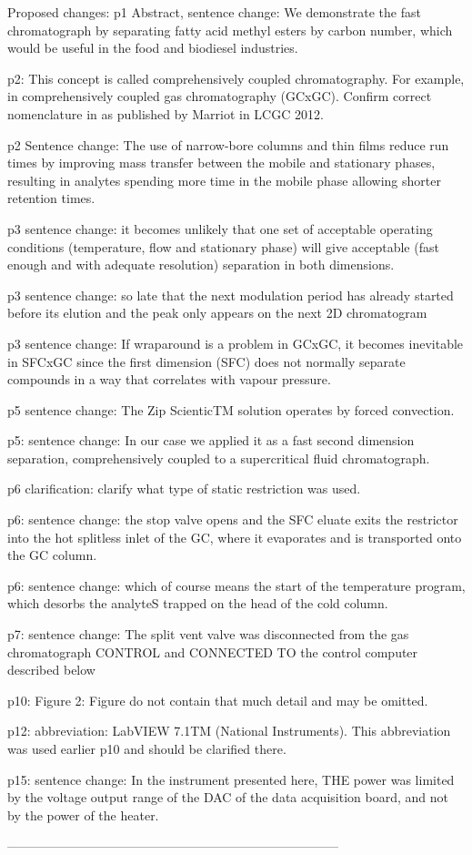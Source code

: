 Proposed changes:
p1 Abstract, sentence change: We demonstrate the fast chromatograph by separating fatty acid methyl esters by carbon number, which would be useful in the food and biodiesel industries.

p2: This concept is called comprehensively coupled chromatography. For example, in comprehensively coupled gas chromatography (GCxGC). Confirm correct nomenclature in as published by Marriot in LCGC 2012.

p2 Sentence change: The use of narrow-bore columns and thin films reduce run times by improving mass transfer between the mobile and stationary phases, resulting in analytes spending more time in the mobile phase allowing shorter retention times.

p3 sentence change: it becomes unlikely that one set of acceptable operating conditions (temperature, flow and stationary phase) will give acceptable (fast enough and with adequate resolution) separation in both dimensions.

p3 sentence change: so late that the next modulation period has already started before its elution and the peak only appears on the next 2D chromatogram

p3 sentence change: If wraparound is a problem in GCxGC, it becomes inevitable in SFCxGC since the first dimension (SFC) does not normally separate compounds in a way that correlates with vapour pressure.

p5 sentence change: The Zip ScienticTM solution operates by forced convection.

p5: sentence change: In our case we applied it as a fast second dimension separation, comprehensively coupled to a supercritical fluid chromatograph.

p6 clarification: clarify what type of static restriction was used.

p6: sentence change: the stop valve opens and the SFC eluate exits the restrictor into the hot splitless inlet of the GC, where it evaporates and is transported onto the GC column.

p6: sentence change: which of course means the start of the temperature program, which desorbs the analyteS trapped on the head of the cold column.

p7: sentence change: The split vent valve was disconnected from the gas chromatograph CONTROL and CONNECTED TO the control computer described below

p10: Figure 2: Figure do not contain that much detail and may be omitted.

p12: abbreviation: LabVIEW 7.1TM (National Instruments). This abbreviation was used earlier p10 and should be clarified there.

p15: sentence change: In the instrument presented here, THE power was limited by the voltage output range of the DAC of the data acquisition board, and not by the power of the heater.



------------------------------------------------------------------------------
